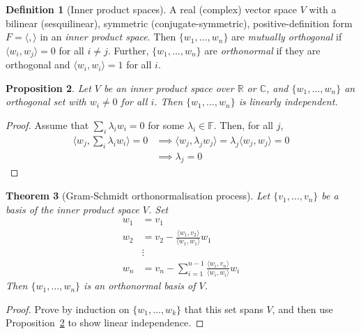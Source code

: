 \documentclass[10pt,fleqn]{article}
\newcommand{\comps}{\mathbb{C}}
\newcommand{\reals}{\mathbb{R}}
\newcommand{\field}{\mathbb{F}}
\theoremstyle{definition} \newtheorem{defn}{Definition}[section]
\theoremstyle{plain}      \newtheorem{thm}[defn]{Theorem}
\theoremstyle{plain}      \newtheorem{prop}[defn]{Proposition}
\theoremstyle{plain}      \newtheorem{lem}[defn]{Lemma}
\theoremstyle{plain}      \newtheorem{cor}[defn]{Corollary}
\theoremstyle{plain}      \newtheorem{ad}[defn]{Addendum}
\theoremstyle{definition} \newtheorem{ex}[defn]{Example}
\theoremstyle{definition} \newtheorem{rem}[defn]{Remark}
\numberwithin{equation}{subsection}
\begin{document}
\begin{defn}[Inner product spaces]
    A real (complex) vector space $V$ with a bilinear (sesquilinear), symmetric (conjugate-symmetric), positive-definition form $F=\langle,\rangle$ in an \emph{inner product space}.
    Then $\{w_1,\ldots,w_n\}$ are \emph{mutually orthogonal} if $\langle w_i,w_j\rangle=0$ for all $i\neq j$.
    Further, $\{w_1,\ldots,w_n\}$ are \emph{orthonormal} if they are orthogonal and $\langle w_i,w_i\rangle=1$ for all $i$.
\end{defn}

\begin{prop}\label{orthog-implies-indep}
    Let $V$ be an inner product space over $\reals$ or $\comps$, and $\{w_1,\ldots,w_n\}$ an orthogonal set with $w_i\neq0$ for all $i$.
    Then $\{w_1,\ldots,w_n\}$ is linearly independent.
\end{prop}

\begin{proof}
    Assume that $\sum_i\lambda_i w_i=0$ for some $\lambda_i\in\field$.
    Then, for all $j$,
    \begin{align*}
        \langle w_j,\sum_i\lambda_i w_i\rangle=0
        &\implies
        \langle w_j,\lambda_j w_j\rangle=\lambda_j\langle w_j,w_j\rangle=0\\
        &\implies
        \lambda_j=0
    \end{align*}
\end{proof}

\begin{thm}[Gram-Schmidt orthonormalisation process]
    Let $\{v_1,\ldots,v_n\}$ be a basis of the inner product space $V$.
    Set
    \begin{align*}
        w_1
        &=
        v_1\\
        w_2
        &=
        v_2-\frac{\langle w_1,v_2\rangle}{\langle w_1,w_1\rangle}w_1\\
        &\vdots\\
        w_n
        &=
        v_n-\sum_{i=1}^{n-1}\frac{\langle w_i,v_n\rangle}{\langle w_i,w_i\rangle}w_i
    \end{align*}
    Then $\{w_1,\ldots,w_n\}$ is an orthonormal basis of $V$.
\end{thm}

\begin{proof}
    Prove by induction on $\{w_1,\ldots,w_k\}$ that this set spans $V$, and then use Proposition~\ref{orthog-implies-indep} to show linear independence.
\end{proof}
\end{document}
